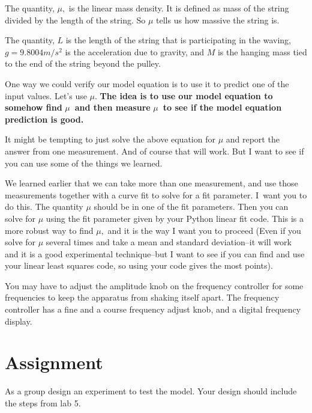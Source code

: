 \documentclass[twoside,11pt,ShortChapTitles]{BYUTextbook}
\begin{document}
The quantity, $\mu,$ is the linear mass density. It is defined as mass of the
string divided by the length of the string. So $\mu$ tells us how massive the
string is.

The quantity, $L$ is the length of the string that is participating in the
waving, $g=9.8004\unit{m}/\unit{s}^2$ is the acceleration due to gravity, and $M$ is the hanging mass tied to
the end of the string beyond the pulley.

One way we could verify our model equation is to use it to predict one of the
input values. Let's use $\mu$. \textbf{The idea is to use our model equation
to somehow find }$\mu$\textbf{\ and then measure }$\mu$\textbf{\ to see if the
model equation prediction is good.}

It might be tempting to just solve the above equation for $\mu$ and report the
answer from one measurement. And of course that will work. But I want to see if you can use some of the things we learned.

We learned earlier that we can take more than one measurement, and use those
measurements together with a curve fit to solve for a fit parameter. I\ want
you to do this. The quantity $\mu$ should be in one of the fit parameters.
Then you can solve for $\mu$ using the fit parameter given by your Python
linear fit code. This is a more robust way to find $\mu,$ and it is the way I want you to proceed (Even
if you solve for $\mu$ several times and take a mean and standard
deviation--it will work and it is a good experimental technique--but I want to
see if you can find and use your linear least squares code, so using your code
gives the most points).

You may have to adjust the amplitude knob on the frequency controller for some
frequencies to keep the apparatus from shaking itself apart. The frequency
controller has a fine and a course frequency adjust knob, and a digital
frequency display.

\section{Assignment}

As a group design an experiment to test the model. Your design should
include the steps from lab 5.
\end{document}
